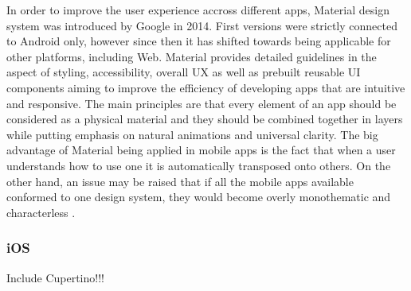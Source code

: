 In order to improve the user experience accross different apps, Material design system was introduced by Google in 2014. First versions were strictly connected to Android only, however since then it has shifted towards being applicable for other platforms, including Web. Material provides detailed guidelines in the aspect of styling, accessibility, overall UX as well as prebuilt reusable UI components aiming to improve the efficiency of developing apps that are intuitive and responsive. The main principles are that every element of an app should be considered as a physical material and they should be combined together in layers while putting emphasis on natural animations and universal clarity. The big advantage of Material being applied in mobile apps is the fact that when a user understands how to use one it is automatically transposed onto others. On the other hand, an issue may be raised that if all the mobile apps available conformed to one design system, they would become overly monothematic and characterless \cite{material_design_get_started}\cite{material_design_pros_cons}.

\subsubsection{iOS}
Include Cupertino!!!
